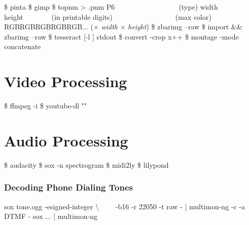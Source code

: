 \documentclass{refcard}
\begin{document}
\begin{ldesc}
	   \$ pinta 
	 \$ gimp 
	    \$ topnm  > .pnm
	 P6~~~~~~~~~~~~~~~~~~\textnormal{(type)}\li
	                      width height~~~~~~~~\textnormal{(in printable digits)} ~~~~~~~~~~~~~~~~~\textnormal{(max color)} \li
					      RGBRGBRGBRGBRGB...  \textnormal{($\times$ \textit{width} $\times$ \textit{height})}
	   \$ zbarimg --raw 
	 \$ import  \&\& zbarimg --raw 
	 \$ tesseract [-l ]  stdout
	\li[Crop]                 \$ convert -crop x++  
	       \$ montage -mode concatenate  
\end{ldesc}


\section{Video Processing}

\begin{ldesc}
	  \$ ffmpeg -i  
	 \$ youtube-dl ""
\end{ldesc}


\section{Audio Processing}

\begin{ldesc}
	   \$ audacity 
	\li[Spectrogram]                   \$ sox  -n spectrogram
	       \$ midi2ly 
	          \$ lilypond 
\end{ldesc}

\subsubsection{Decoding Phone Dialing Tones}

\begin{ldesc}
	   sox tone.ogg -esigned-integer \textbackslash \li
	                   ~~~~-b16 -r 22050 -t raw - | \li
	                   multimon-ng -c -a DTMF -
	 sox ... | multimon-ng
\end{ldesc}
\end{document}
